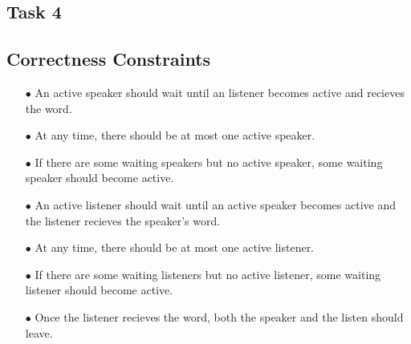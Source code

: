 \documentclass{article}
\begin{document}
\begin{spacing}{1.1}
    \section{Task 4}

    \subsection{Correctness Constraints}
    \begin{enumerate}
      \item[$\bullet$] An active speaker should wait until an listener becomes active and 
	recieves the word.
      \item[$\bullet$] At any time, there should be at most one active speaker.
      \item[$\bullet$] If there are some waiting speakers but no active speaker,
	some waiting speaker should become active.
      \item[$\bullet$] An active listener should wait until an active speaker becomes
	active and the listener recieves the speaker's word.
      \item[$\bullet$] At any time, there should be at most one active listener.
      \item[$\bullet$] If there are some waiting listeners but no active listener,
	some waiting listener should become active.
      \item[$\bullet$] Once the listener recieves the word, both the speaker and
	the listen should leave.
    \end{enumerate}


\end{spacing}
\end{document}

